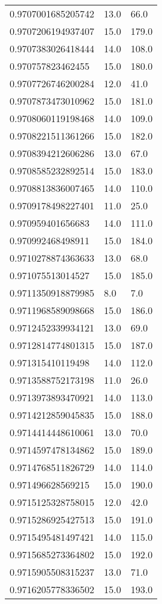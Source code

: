 \begin{center}
\begin{supertabular}[H]{p{0.30\textwidth}p{0.05\textwidth}p{0.05\textwidth}}
0.9707001685205742 & 13.0 & 66.0 \\ 
0.9707206194937407 & 15.0 & 179.0 \\ 
0.9707383026418444 & 14.0 & 108.0 \\ 
0.970757823462455 & 15.0 & 180.0 \\ 
0.9707726746200284 & 12.0 & 41.0 \\ 
0.9707873473010962 & 15.0 & 181.0 \\ 
0.9708060119198468 & 14.0 & 109.0 \\ 
0.9708221511361266 & 15.0 & 182.0 \\ 
0.9708394212606286 & 13.0 & 67.0 \\ 
0.9708585232892514 & 15.0 & 183.0 \\ 
0.9708813836007465 & 14.0 & 110.0 \\ 
0.9709178498227401 & 11.0 & 25.0 \\ 
0.970959401656683 & 14.0 & 111.0 \\ 
0.970992468498911 & 15.0 & 184.0 \\ 
0.9710278874363633 & 13.0 & 68.0 \\ 
0.971075513014527 & 15.0 & 185.0 \\ 
0.9711350918879985 & 8.0 & 7.0 \\ 
0.9711968589098668 & 15.0 & 186.0 \\ 
0.9712452339934121 & 13.0 & 69.0 \\ 
0.9712814774801315 & 15.0 & 187.0 \\ 
0.971315410119498 & 14.0 & 112.0 \\ 
0.9713588752173198 & 11.0 & 26.0 \\ 
0.9713973893470921 & 14.0 & 113.0 \\ 
0.9714212859045835 & 15.0 & 188.0 \\ 
0.9714414448610061 & 13.0 & 70.0 \\ 
0.9714597478134862 & 15.0 & 189.0 \\ 
0.9714768511826729 & 14.0 & 114.0 \\ 
0.971496628569215 & 15.0 & 190.0 \\ 
0.9715125328758015 & 12.0 & 42.0 \\ 
0.9715286925427513 & 15.0 & 191.0 \\ 
0.9715495481497421 & 14.0 & 115.0 \\ 
0.9715685273364802 & 15.0 & 192.0 \\ 
0.9715905508315237 & 13.0 & 71.0 \\ 
0.9716205778336502 & 15.0 & 193.0 \\ 

\end{supertabular}
\end{center}
